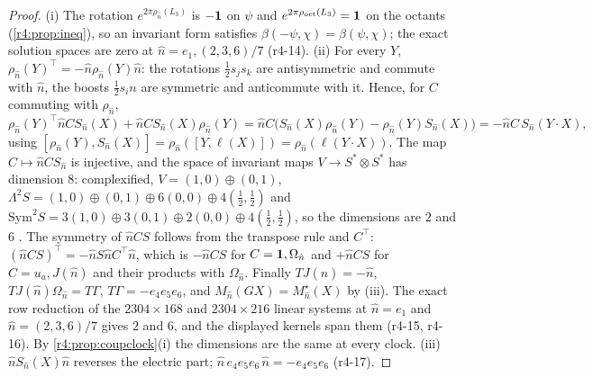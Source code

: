 \begin{proof}
(i) The rotation $e^{2\pi\rho_{\hat n}(L_3)}$ is $-\mathbf 1$ on $\psi$ and $e^{2\pi\rho_{\rm oct}(L_3)}=\mathbf 1$ on the octants (\cref{r4:prop:ineq}), so an invariant form satisfies
$\beta(-\psi,\chi)=\beta(\psi,\chi)$; the exact solution spaces are zero at $\hat n=e_1,(2,3,6)/7$ (r4-14). (ii) For every $Y$, $\rho_{\hat n}(Y)^{\!\top}=-\hat n\rho_{\hat n}(Y)\hat n$: the rotations
$\tfrac12s_js_k$ are antisymmetric and commute with $\hat n$, the boosts $\tfrac12s_in$ are symmetric and anticommute with it. Hence, for $C$ commuting with $\rho_{\hat n}$,
\[
\rho_{\hat n}(Y)^{\!\top}\hat nCS_{\hat n}(X)+\hat nCS_{\hat n}(X)\rho_{\hat n}(Y)=\hat nC\bigl(S_{\hat n}(X)\rho_{\hat n}(Y)-\rho_{\hat n}(Y)S_{\hat n}(X)\bigr)=-\hat nC\,S_{\hat n}(Y\cdot X),
\]
using $[\rho_{\hat n}(Y),S_{\hat n}(X)]=\rho_{\hat n}([Y,\ell(X)])=\rho_{\hat n}(\ell(Y\cdot X))$. The map $C\mapsto \hat nCS_{\hat n}$ is injective, and the space of invariant maps $V\to S^*\otimes S^*$ has
dimension $8$: complexified, $V=(1,0)\oplus(0,1)$, $\Lambda^2S=(1,0)\oplus(0,1)\oplus6(0,0)\oplus4(\tfrac12,\tfrac12)$ and
$\mathrm{Sym}^2S=3(1,0)\oplus3(0,1)\oplus2(0,0)\oplus4(\tfrac12,\tfrac12)$, so the dimensions are $2$ and $6$ \cite{GoodmanWallach}. The symmetry of $\hat nCS$ follows from the transpose
rule and $C^{\!\top}$: $(\hat nCS)^{\!\top}=-\hat nS\hat nC^{\!\top}\hat n$, which is $-\hat nCS$ for $C=\mathbf 1,\Omega_{\hat n}$ and $+\hat nCS$ for $C=u_a,J(\hat n)$ and their products with $\Omega_{\hat n}$. Finally
$TJ(\hat n)=-\hat n$, $TJ(\hat n)\Omega_{\hat n}=T\Gamma$, $T\Gamma=-e_4e_5e_6$, and $M_{\hat n}(GX)=M^\star_{\hat n}(X)$ by (iii). The exact row reduction of the $2304\times168$ and $2304\times216$ linear
systems at $\hat n=e_1$ and $\hat n=(2,3,6)/7$ gives $2$ and $6$, and the displayed kernels span them (r4-15, r4-16). By \cref{r4:prop:coupclock}(i) the dimensions are
the same at every clock. (iii) $\hat nS_{\hat n}(X)\hat n$ reverses the electric part; $\hat n\,e_4e_5e_6\,\hat n=-e_4e_5e_6$ (r4-17).
\end{proof}

